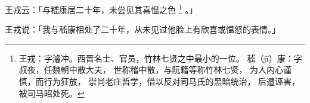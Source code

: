 
\switchcolumn*[\section{}]

王戎云：「与嵇康居二十年，未尝见其喜愠之色%
\footnote{%
    王戎：字濬冲。西晋名士、官员，竹林七贤之中最小的一位。
    嵇（jī）康：字叔夜，任魏朝中散大夫，
                世称稽中散，与阮籍等称竹林七贤，
                为人内心谨慎，而行为狂放，
                崇尚老庄哲学，借以反对司马氏的黑暗统治，
                后遭诬害，被司马昭处死。
}%
。」

\switchcolumn


王戎说：「我与嵇康相处了二十年，从未见过他脸上有欣喜或愠怒的表情。」
